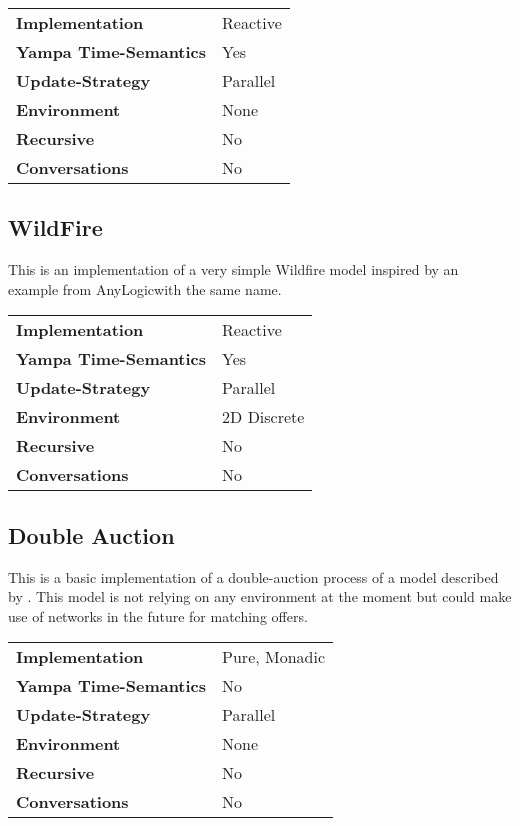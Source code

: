 \begin{center}
\begin{tabular}{l || l }
\textbf{Implementation}			& Reactive \\
\textbf{Yampa Time-Semantics}	& Yes \\
\textbf{Update-Strategy}		& Parallel \\
\textbf{Environment}			& None \\
\textbf{Recursive}				& No \\
\textbf{Conversations}			& No \\
\end{tabular}
\end{center}

\subsection{WildFire}
This is an implementation of a very simple Wildfire model inspired by an example from AnyLogic\texttrademark with the same name.

\begin{center}
\begin{tabular}{l || l }
\textbf{Implementation}			& Reactive \\
\textbf{Yampa Time-Semantics}	& Yes \\
\textbf{Update-Strategy}		& Parallel \\
\textbf{Environment}			& 2D Discrete \\
\textbf{Recursive}				& No \\
\textbf{Conversations}			& No \\
\end{tabular}
\end{center}

\subsection{Double Auction}
This is a basic implementation of a double-auction process of a model described by \cite{breuer_endogenous_2015}. This model is not relying on any environment at the moment but could make use of networks in the future for matching offers.

\begin{center}
\begin{tabular}{l || l }
\textbf{Implementation}			& Pure, Monadic \\
\textbf{Yampa Time-Semantics}	& No \\
\textbf{Update-Strategy}		& Parallel \\
\textbf{Environment}			& None \\
\textbf{Recursive}				& No \\
\textbf{Conversations}			& No \\
\end{tabular}
\end{center}

